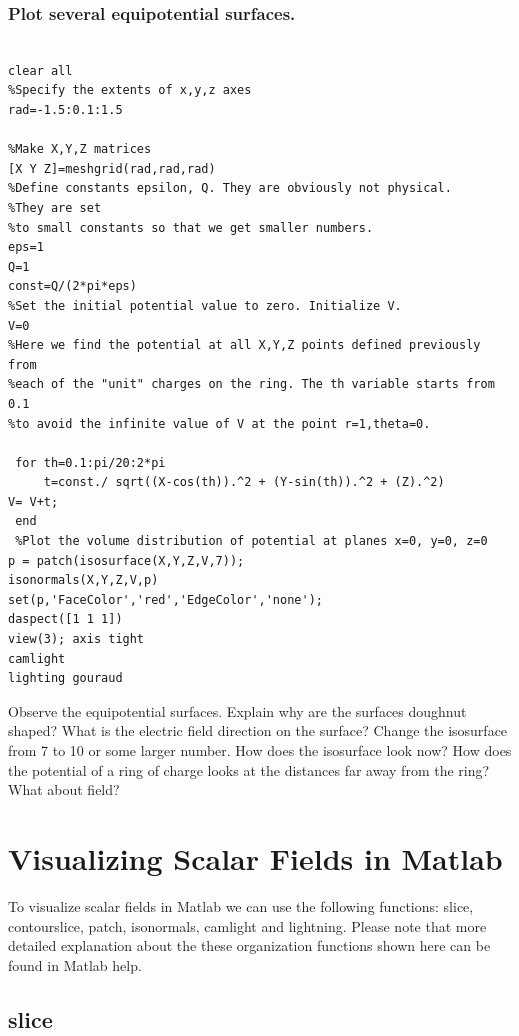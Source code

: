 \documentclass{ximera}
\begin{document}
\subsubsection{ Plot several equipotential surfaces. }




\begin{verbatim}

clear all
%Specify the extents of x,y,z axes
rad=-1.5:0.1:1.5
 
%Make X,Y,Z matrices 
[X Y Z]=meshgrid(rad,rad,rad)
%Define constants epsilon, Q. They are obviously not physical. 
%They are set 
%to small constants so that we get smaller numbers.
eps=1
Q=1
const=Q/(2*pi*eps)
%Set the initial potential value to zero. Initialize V.
V=0
%Here we find the potential at all X,Y,Z points defined previously from
%each of the "unit" charges on the ring. The th variable starts from 0.1
%to avoid the infinite value of V at the point r=1,theta=0. 
 
 for th=0.1:pi/20:2*pi
     t=const./ sqrt((X-cos(th)).^2 + (Y-sin(th)).^2 + (Z).^2)
V= V+t;
 end
 %Plot the volume distribution of potential at planes x=0, y=0, z=0
p = patch(isosurface(X,Y,Z,V,7));
isonormals(X,Y,Z,V,p)
set(p,'FaceColor','red','EdgeColor','none');
daspect([1 1 1])
view(3); axis tight
camlight 
lighting gouraud
\end{verbatim}



Observe the equipotential surfaces. Explain why are the surfaces doughnut shaped? What is the electric field direction on the surface? Change the isosurface from 7 to 10 or some larger number. How does the isosurface look now? How does the potential of a ring of charge looks at the distances far away from the ring? What about field?







\section{Visualizing Scalar Fields in Matlab}

To visualize scalar fields in Matlab we can use the following functions: slice, contourslice, patch, isonormals, camlight and lightning. Please note that more detailed explanation about the these organization functions shown here can be found in Matlab help.

\subsection{slice}
 
\end{document}

